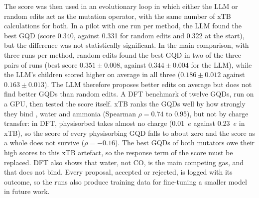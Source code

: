 The score was then used in an evolutionary loop in which either the LLM or random edits act as the
mutation operator, with the same number of xTB calculations for both. In a pilot with one run per
method, the LLM found the best GQD (score 0.340, against 0.331 for random edits and 0.322 at the
start), but the difference was not statistically significant. In the main comparison, with three runs per method, random edits found the best GQD in two
of the three pairs of runs (best score \(0.351 \pm 0.008\), against \(0.344 \pm 0.004\) for the
LLM), while the LLM's children scored higher on average in all three (\(0.186 \pm 0.012\) against
\(0.163 \pm 0.013\)). The LLM therefore proposes better edits on average but does not find better
GQDs than random edits. A DFT benchmark of twelve GQDs, run on a GPU, then tested the score
itself. xTB ranks the GQDs well by how strongly they bind , water and ammonia (Spearman
\(\rho = 0.74\) to 0.95), but not by charge transfer: in DFT, physisorbed  takes almost no
charge (0.01~\(e\) against 0.23~\(e\) in xTB), so the score of every physisorbing GQD falls to about
zero and the score as a whole does not survive (\(\rho = -0.16\)). The best GQDs of both mutators
owe their high scores to this xTB artefact, so the response term of the score must be replaced.
DFT also shows that water, not CO, is the main competing gas, and that  does not bind.
Every proposal, accepted or rejected, is logged with its outcome, so the runs also
produce training data for fine-tuning a smaller model in future work.
